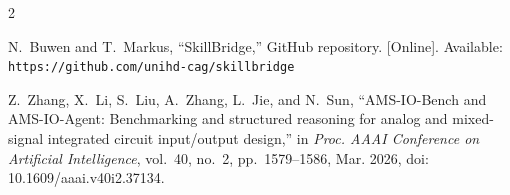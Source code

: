 \documentclass[lettersize,journal]{ieee_template/IEEEtran}
\begin{document}
\begin{thebibliography}{2}

N.~Buwen and T.~Markus, ``SkillBridge,'' GitHub repository. [Online]. Available: \texttt{https://github.com/unihd-cag/skillbridge}

Z.~Zhang, X.~Li, S.~Liu, A.~Zhang, L.~Jie, and N.~Sun, ``AMS-IO-Bench and AMS-IO-Agent: Benchmarking and structured reasoning for analog and mixed-signal integrated circuit input/output design,'' in \emph{Proc. AAAI Conference on Artificial Intelligence}, vol.~40, no.~2, pp.~1579--1586, Mar. 2026, doi: 10.1609/aaai.v40i2.37134.

\end{thebibliography}
\end{document}
